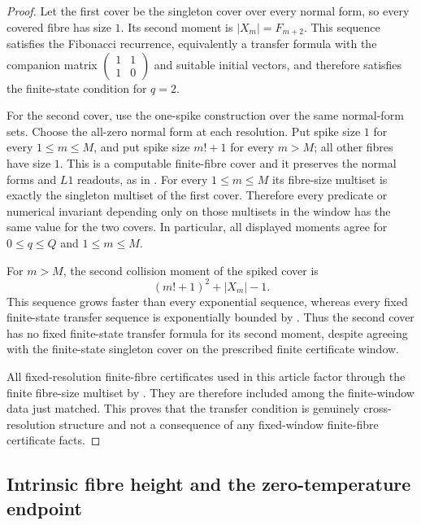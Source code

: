 \begin{proof}
Let the first cover be the singleton cover over every normal form, so every
covered fibre has size \(1\).  Its second moment is \(|X_m|=F_{m+2}\).  This
sequence satisfies the Fibonacci recurrence, equivalently a transfer formula
with the companion matrix
\(\begin{pmatrix}1&1\\1&0\end{pmatrix}\) and suitable initial vectors, and
therefore satisfies the finite-state condition for \(q=2\).

For the second cover, use the one-spike construction over the same normal-form
sets.  Choose the all-zero normal form at each resolution.  Put spike size
\(1\) for every \(1\le m\le M\), and put spike size \(m!+1\) for every
\(m>M\); all other fibres have size \(1\).  This is a computable finite-fibre
cover and it preserves the normal forms and \(L1\) readouts, as in
.  For every \(1\le m\le M\) its fibre-size
multiset is exactly the singleton multiset of the first cover.  Therefore every
predicate or numerical invariant depending only on those multisets in the window
has the same value for the two covers.  In particular, all displayed moments
agree for \(0\le q\le Q\) and \(1\le m\le M\).

For \(m>M\), the second collision moment of the spiked cover is
\[
  (m!+1)^2+|X_m|-1 .
\]
This sequence grows faster than every exponential sequence, whereas every fixed
finite-state transfer sequence is exponentially bounded by
.  Thus the second cover has no fixed
finite-state transfer formula for its second moment, despite agreeing with the
finite-state singleton cover on the prescribed finite certificate window.

All fixed-resolution finite-fibre certificates used in this article factor
through the finite fibre-size multiset by
.
They are therefore included among the finite-window data just matched.  This
proves that the transfer condition is genuinely cross-resolution structure and
not a consequence of any fixed-window finite-fibre certificate facts.
\end{proof}


\subsection{Intrinsic fibre height and the zero-temperature endpoint}
\label{ssec:intrinsic-height-zero-temperature}

